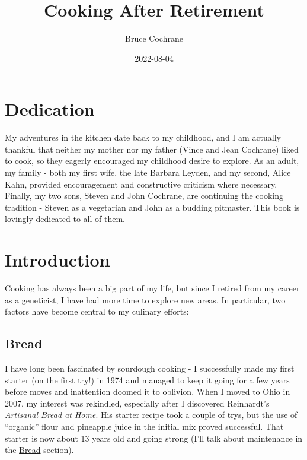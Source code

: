 \documentclass[
]{book}
\title{Cooking After Retirement}
\author{Bruce Cochrane}
\date{2022-08-04}
\begin{document}
\maketitle

{
\setcounter{tocdepth}{1}
\tableofcontents
}
\hypertarget{dedication}{%
\chapter*{Dedication}\label{dedication}}

My adventures in the kitchen date back to my childhood, and I am actually thankful that neither my mother nor my father (Vince and Jean Cochrane) liked to cook, so they eagerly encouraged my childhood desire to explore. As an adult, my family - both my first wife, the late Barbara Leyden, and my second, Alice Kahn, provided encouragement and constructive criticism where necessary. Finally, my two sons, Steven and John Cochrane, are continuing the cooking tradition - Steven as a vegetarian and John as a budding pitmaster. This book is lovingly dedicated to all of them.

\hypertarget{introduction}{%
\chapter{Introduction}\label{introduction}}

Cooking has always been a big part of my life, but since I retired from my career as a geneticist, I have had more time to explore new areas. In particular, two factors have become central to my culinary efforts:

\hypertarget{bread}{%
\section{Bread}\label{bread}}

I have long been fascinated by sourdough cooking - I successfully made my first starter (on the first try!) in 1974 and managed to keep it going for a few years before moves and inattention doomed it to oblivion. When I moved to Ohio in 2007, my interest was rekindled, especially after I discovered Reinhardt's \emph{Artisanal Bread at Home}. His starter recipe took a couple of trys, but the use of ``organic'' flour and pineapple juice in the initial mix proved successful. That starter is now about 13 years old and going strong (I'll talk about maintenance in the \protect\hyperlink{bread}{Bread} section).
\end{document}
